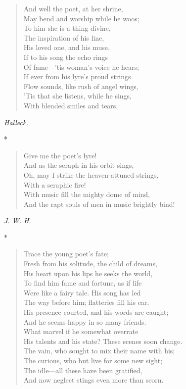 \documentclass[11pt,twoside]{article}
\newcommand\stars{\begin{center}*\quad*\quad*\end{center}}
\newcommand\by[1]{\par\hfill\textit{#1}\par}
\begin{document}
\begin{verse}
And well the poet, at her shrine,\\
\quad May bend and worship while he woos;\\
To him she is a thing divine,\\
The inspiration of his line,\\
\quad His loved one, and his muse.\\
If to his song the echo rings\\
\quad Of fame---’tis woman’s voice he hears;\\
If ever from his lyre’s proud strings\\
Flow sounds, like rush of angel wings,\\
’Tis that she listens, while he sings,\\
\quad With blended smiles and tears.
\end{verse}

\by{Halleck.}

\stars

\begin{verse}
\quad Give me the poet’s lyre!\\
And as the seraph in his orbit sings,\\
Oh, may I strike the heaven-attuned strings,\\
\quad With a seraphic fire!\\
With music fill the mighty dome of mind,\\
And the rapt souls of men in music brightly bind!
\end{verse}

\by{J. W. H.}

\stars

\begin{verse}
\quad Trace the young poet’s fate;\\
Fresh from his solitude, the child of dreams,\\
His heart upon his lips he seeks the world,\\
To find him fame and fortune, as if life\\
Were like a fairy tale. His song has led\\
The way before him; flatteries fill his ear,\\
His presence courted, and his words are caught;\\
And he seems happy in so many friends.\\
What marvel if he somewhat overrate\\
His talents and his state? These scenes soon change.\\
The vain, who sought to mix their name with his;\\
The curious, who but live for some new sight;\\
The idle---all these have been gratified,\\
And now neglect stings even more than scorn.
\end{verse}
\end{document}
